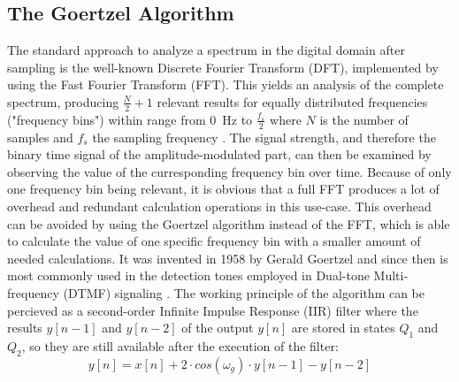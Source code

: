 \documentclass[conference]{IEEEtran}
\begin{document}
\subsection{The Goertzel Algorithm}
The standard approach to analyze a spectrum in the digital domain after sampling is the well-known Discrete Fourier Transform (DFT), implemented by using
the Fast Fourier Transform (FFT). This yields an analysis of the complete spectrum, producing $\frac{N}{2} + 1$ relevant results for equally distributed frequencies
("frequency bins") within range from \SI{0}{\hertz} to $\frac{f_{s}}{2}$ where $N$ is the number of samples and $f_{s}$ the sampling frequency \cite{b6}.
The signal strength, and therefore the binary time signal of the amplitude-modulated part, can then be examined by observing the value of the curresponding frequency bin
over time. Because of only one frequency bin being relevant, it is obvious that a full FFT produces a lot of overhead and redundant calculation operations in this use-case. 
This overhead can be avoided by using the Goertzel algorithm instead of the FFT, which is able to calculate the value of one specific frequency bin with a smaller
amount of needed calculations.
It was invented in 1958 by Gerald Goertzel and since then is most commonly used in the detection tones employed in Dual-tone Multi-frequency (DTMF) signaling \cite{b7}.
The working principle of the algorithm can be percieved as a second-order Infinite Impulse Response (IIR) filter where the results $y[n-1]$ and $y[n-2]$ of the output $y[n]$
are stored in states $Q_{1}$ and $Q_{2}$, so they are still available after the execution of the filter:
\begin{equation}
    y[n] = x[n] + 2 \cdot cos(\omega_{g}) \cdot y[n-1] - y[n-2]
\end{equation}
\end{document}
